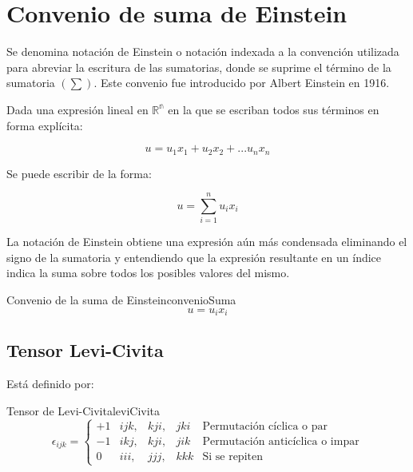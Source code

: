 
\section*{Convenio de suma de Einstein}

Se denomina notación de Einstein o notación indexada a la convención utilizada
para abreviar la escritura de las sumatorias, donde se suprime el término de la
sumatoria $(\sum)$. Este convenio fue introducido por Albert Einstein en 1916.

Dada una expresión lineal en $\mathbb{R^{n}}$ en la que se escriban todos sus
términos en forma explícita:

\begin{equation}
    u = u_1 x_1 + u_2 x_2 + ...u_n x_n
\end{equation}

Se puede escribir de la forma:

\begin{equation}
    u = \sum_{i=1}^{n} u_ix_i
\end{equation}

La notación de Einstein obtiene una expresión aún más condensada eliminando el
signo de la sumatoria y entendiendo que la expresión resultante en un índice
indica la suma sobre todos los posibles valores del mismo.

\begin{theorem}{Convenio de la suma de Einstein}{convenioSuma}
    \begin{equation}
        u = u_ix_i
    \end{equation}
\end{theorem}

\subsection*{Tensor Levi-Civita}

Está definido por:

\begin{theorem}{Tensor de Levi-Civita}{leviCivita}
\begin{equation}
    \epsilon_{ijk}=
    \left\lbrace\begin{array}{ccccl} 
        +1 & ijk, & kji, & jki & \text{Permutación cíclica o par}\\ 
        -1 & ikj, & kji, & jik & \text{Permutación anticíclica o impar}\\
        0  & iii, & jjj, & kkk & \text{Si se repiten}
    \end{array}\right.
\end{equation}
\end{theorem}

